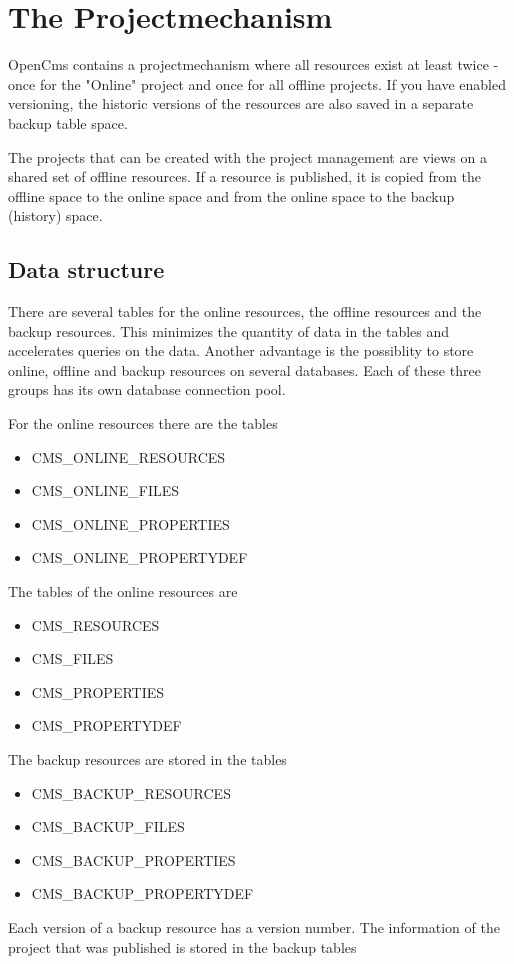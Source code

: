 \section{The Projectmechanism}

OpenCms contains a projectmechanism where all resources exist at least twice -
once for the "Online" project and once for all offline projects. If you 
have enabled versioning, the historic versions of the resources are also 
saved in a separate backup table space.

The projects that can be created with the project management are views on a shared set of offline resources.
If a resource is published, it is copied from the offline space to the online space
and from the online space to the backup (history) space.

\subsection{Data structure}
 
 

There are several tables for the online resources, the offline
resources and the backup resources. This minimizes the quantity of
data in the tables and accelerates queries on the data. Another
advantage is the possiblity to store online, offline and backup
resources on several databases. Each of these three groups has its
own database connection pool.

For the online resources there are the tables
\begin{itemize}
\item CMS\_ONLINE\_RESOURCES
\item CMS\_ONLINE\_FILES
\item CMS\_ONLINE\_PROPERTIES
\item CMS\_ONLINE\_PROPERTYDEF
\end{itemize}

The tables of the online resources are
\begin{itemize}
\item CMS\_RESOURCES
\item CMS\_FILES
\item CMS\_PROPERTIES
\item CMS\_PROPERTYDEF
\end{itemize}

The backup resources are stored in the tables
\begin{itemize}
\item CMS\_BACKUP\_RESOURCES
\item CMS\_BACKUP\_FILES
\item CMS\_BACKUP\_PROPERTIES
\item CMS\_BACKUP\_PROPERTYDEF
\end{itemize}
Each version of a backup resource has a version number. The
information of the project that was published is stored in the
backup tables


